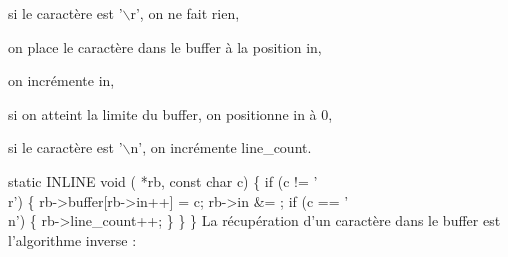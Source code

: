 \documentclass{scrartcl}%
\begin{document}
\begin{packed_itemize}
  \item si le caractère est '$\backslash$r', on ne fait rien,
  \item on place le caractère dans le buffer à la position {\Tt{}in\nwendquote},
  \item on incrémente {\Tt{}in\nwendquote},
  \item si on atteint la limite du buffer, on positionne {\Tt{}in\nwendquote} à 0,
  \item si le caractère est '$\backslash$n', on incrémente {\Tt{}line{\_}count\nwendquote}.
\end{packed_itemize}

\nwenddocs{}\endmoddef\nwstartdeflinemarkup{}\nwenddeflinemarkup
static INLINE void ( *rb, const char c) \{
    if (c != '\\r') \{
        rb->buffer[rb->in++] = c;
        rb->in &= ;
        if (c == '\\n') \{
            rb->line_count++;
        \}
    \}
\}
\nwendcode{}\nwdocspar
\noindent\makebox[\linewidth]{\rule{\paperwidth}{0.4pt}}
La récupération d'un caractère dans le buffer est l'algorithme inverse :
\end{document}
